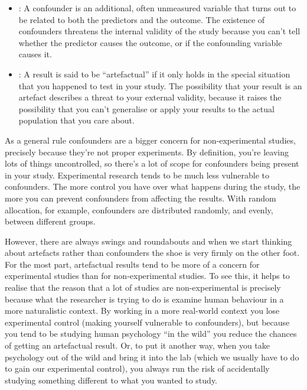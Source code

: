 \begin{itemize}
\item {}: A confounder is an additional, often unmeasured variable that turns out to be related to both the predictors and the outcome. The existence of confounders threatens the internal validity of the study because you can't tell whether the predictor causes the outcome, or if the confounding variable causes it.
\item {}: A result is said to be ``artefactual'' if it only holds in the special situation that you happened to test in your study. The possibility that your result is an artefact describes a threat to your external validity, because it raises the possibility that you can't generalise or apply your results to the actual population that you care about.
\end{itemize}

As a general rule confounders are a bigger concern for non-experimental studies, precisely because they're not proper experiments. By definition, you're leaving lots of things uncontrolled, so there's a lot of scope for confounders being present in your study. Experimental research tends to be much less vulnerable to confounders. The more control you have over what happens during the study, the more you can prevent confounders from affecting the results. With random allocation, for example, confounders are distributed randomly, and evenly, between different groups.

However, there are always swings and roundabouts and when we start thinking about artefacts rather than confounders the shoe is very firmly on the other foot. For the most part, artefactual results tend to be more of a concern for experimental studies than for non-experimental studies. To see this, it helps to realise that the reason that a lot of studies are non-experimental is precisely because what the researcher is trying to do is examine human behaviour in a more naturalistic context. By working in a more real-world context you lose experimental control (making yourself vulnerable to confounders), but because you tend to be studying human psychology ``in the wild'' you reduce the chances of getting an artefactual result. Or, to put it another way, when you take psychology out of the wild and bring it into the lab (which we usually have to do to gain our experimental control), you always run the risk of accidentally studying something different to what you wanted to study. 

